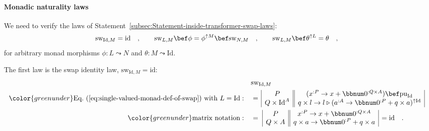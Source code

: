 \paragraph{Monadic naturality laws}

We need to verify the laws of Statement~\ref{subsec:Statement-inside-transformer-swap-laws}:
\[
\text{sw}_{\text{Id},M}=\text{id}\quad,\quad\quad\text{sw}_{L,M}\bef\phi=\phi^{\uparrow M}\bef\text{sw}_{N,M}\quad,\quad\quad\text{sw}_{L,M}\bef\theta^{\uparrow L}=\theta\quad,
\]
for arbitrary monad morphisms $\phi:L\leadsto N$ and $\theta:M\leadsto\text{Id}$.

The first law is the swap identity law, $\text{sw}_{\text{Id},M}=\text{id}$:
\begin{align*}
 & \text{sw}_{\text{Id},M}\\
{\color{greenunder}\text{Eq.~(\ref{eq:single-valued-monad-def-of-swap}) with }L=\text{Id}:}\quad & =\,\begin{array}{|c||c|}
P & (x^{:P}\rightarrow x+\bbnum 0^{:Q\times A})\bef\text{pu}_{\text{Id}}\\
Q\times\text{Id}^{A} & q\times l\rightarrow l\triangleright(a^{:A}\rightarrow\bbnum 0^{:P}+q\times a)^{\uparrow\text{Id}}
\end{array}\\
{\color{greenunder}\text{matrix notation}:}\quad & =\,\,\begin{array}{|c||c|}
P & x^{:P}\rightarrow x+\bbnum 0^{:Q\times A}\\
Q\times A & q\times a\rightarrow\bbnum 0^{:P}+q\times a
\end{array}\,=\text{id}\quad.
\end{align*}


